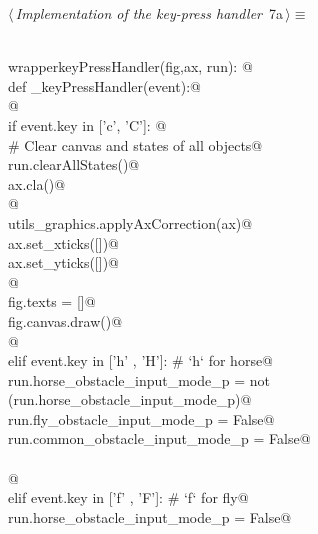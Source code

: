 \documentclass[11.5pt]{report}
\begin{document}
\begin{flushleft} \small\label{scrap6}\raggedright\small
{} $\langle\,${\itshape Implementation of the key-press handler}\nobreak\ {\footnotesize {7a}}$\,\rangle\equiv$
\vspace{-1ex}
\begin{list}{}{} \item
\mbox{}\verb@@\\
\mbox{}\verb@def wrapperkeyPressHandler(fig,ax, run): @\\
\mbox{}\verb@      def _keyPressHandler(event):@\\
\mbox{}\verb@                      @\\
\mbox{}\verb@             if event.key in ['c', 'C']: @\\
\mbox{}\verb@                   # Clear canvas and states of all objects@\\
\mbox{}\verb@                    run.clearAllStates()@\\
\mbox{}\verb@                    ax.cla()@\\
\mbox{}\verb@                                  @\\
\mbox{}\verb@                    utils_graphics.applyAxCorrection(ax)@\\
\mbox{}\verb@                    ax.set_xticks([])@\\
\mbox{}\verb@                    ax.set_yticks([])@\\
\mbox{}\verb@                                     @\\
\mbox{}\verb@                    fig.texts = []@\\
\mbox{}\verb@                    fig.canvas.draw()@\\
\mbox{}\verb@             @\\
\mbox{}\verb@             elif event.key in ['h' , 'H']: # `h` for horse@\\
\mbox{}\verb@                  run.horse_obstacle_input_mode_p    = not (run.horse_obstacle_input_mode_p)@\\
\mbox{}\verb@                  run.fly_obstacle_input_mode_p      = False@\\
\mbox{}\verb@                  run.common_obstacle_input_mode_p   = False@\\
\mbox{}\verb@@\\
\mbox{}\verb@    @\\
\mbox{}\verb@             elif event.key in ['f' , 'F']: # `f` for fly@\\
\mbox{}\verb@                  run.horse_obstacle_input_mode_p   = False@\\

\end{list}
\end{flushleft}
\end{document}

